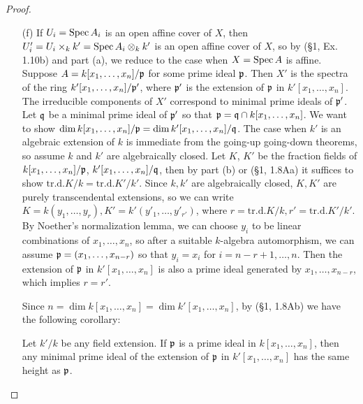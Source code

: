 \documentclass{article}
\begin{document}
\begin{enumerate} [label=\textbf{\arabic*.}, leftmargin=0em]
\begin{proof}
\begin{itemize} [leftmargin=0cm]
    \item[(f)] If $U_i = \operatorname{Spec}{A_i}$ is an open affine cover of $X$, then $U_i' = U_i \times_k k' = \operatorname{Spec}{A_i \otimes_k k'}$ is an open affine cover of $X$, so by (\S 1, Ex. 1.10b) and part (a), we reduce to the case when $X = \operatorname{Spec}{A}$ is affine. Suppose $A = k[x_1, \dots, x_n] / \mathfrak{p}$ for some prime ideal $\mathfrak{p}$. Then $X'$ is the spectra of the ring $k'[x_1, \dots, x_n]/\mathfrak{p}'$, where $\mathfrak{p}'$ is the extension of $\mathfrak{p}$ in $k'[x_1, \dots, x_n]$. The irreducible components of $X'$ correspond to minimal prime ideals of $\mathfrak{p}'$. Let $\mathfrak{q}$ be a minimal prime ideal of $\mathfrak{p}'$ so that $\mathfrak{p} = \mathfrak{q} \cap k[x_1, \dots, x_n]$. We want to show $\dim{k[x_1, \dots, x_n] / \mathfrak{p}} = \dim{k'[x_1, \dots, x_n] / \mathfrak{q}}$. The case when $k'$ is an algebraic extension of $k$ is immediate from the going-up going-down theorems, so assume $k$ and $k'$ are algebraically closed. Let $K$, $K'$ be the fraction fields of $k[x_1, \dots, x_n] / \mathfrak{p}$, $k'[x_1, \dots, x_n] / \mathfrak{q}$, then by part (b) or (\S 1, 1.8Aa) it suffices to show $\text{tr.d.} K/k = \text{tr.d.} K'/k'$. Since $k, k'$ are algebraically closed, $K, K'$ are purely transcendental extensions, so we can write $K = k(y_1, \dots, y_r), K' = k'(y'_1, \dots, y'_{r'})$, where $r = \text{tr.d.}K/k, r' = \text{tr.d.}K'/k'$. By Noether's normalization lemma, we can choose $y_i$ to be linear combinations of $x_1, \dots, x_n$, so after a suitable $k$-algebra automorphism, we can assume $\mathfrak{p} = (x_1, \dots, x_{n - r})$ so that $y_i = x_i$ for $i = n - r + 1, \dots, n$. Then the extension of $\mathfrak{p}$ in $k'[x_1, \dots, x_n]$ is also a prime ideal generated by $x_1, \dots, x_{n - r}$, which implies $r = r'$.
    
    Since $n = \dim{k[x_1, \dots, x_n]} = \dim{k'[x_1, \dots, x_n]}$, by (\S 1, 1.8Ab) we have the following corollary:
    \begin{corollary}
        Let $k'/k$ be any field extension. If $\mathfrak{p}$ is a prime ideal in $k[x_1, \dots, x_n]$, then any minimal prime ideal of the extension of $\mathfrak{p}$ in $k'[x_1, \dots, x_n]$ has the same height as $\mathfrak{p}$.
    \end{corollary}
\end{itemize}
\end{proof}

\end{enumerate}
\end{document}
